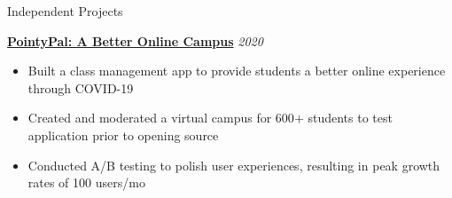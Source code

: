 \documentclass{resume/resume}
\begin{document}
%
%
%

%
%
%
\begin{rSection}{Independent Projects}
    

    \href{https://github.com/UtahTriangle/pointypal}{\bf PointyPal: A Better Online Campus} \hfill {\em 2020}
    \vspace{-6pt}
    \begin{itemize}[nosep]
        \item Built a class management app to provide students a better online experience through COVID-19
        \item Created and moderated a virtual campus for 600$+$ students to test application prior to opening source 
        \item Conducted A/B testing to polish user experiences, resulting in peak growth rates of 100 users/mo
    \end{itemize}



\end{rSection}
\end{document}

